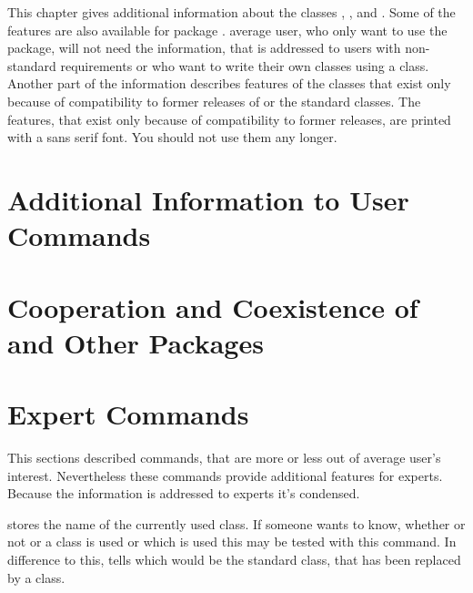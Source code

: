 This chapter gives additional information about the \KOMAScript{} classes
, , and . Some of the features
are also available for package .  average user, who only
want to use the package, will not need the information, that is addressed to
users with non-standard requirements or who want to write their own classes
using a \KOMAScript{} class. Another part of the information describes features
of the classes that exist only because of compatibility to former
releases of \KOMAScript{} or the standard classes. The features, that exist
only because of compatibility to former \KOMAScript{} releases, are printed
with a sans serif font. You should not use them any longer.


\section{Additional Information to User Commands}



\section{Cooperation and Coexistence of \KOMAScript{} and Other Packages}



\section{Expert Commands}

This sections described commands, that are more or less out of average user's
interest. Nevertheless these commands provide additional features for
experts. Because the information is addressed to experts it's condensed.


\begin{Declaration}
\end{Declaration}
 stores the name of the currently used \KOMAScript{}
class. If someone wants to know, whether or not or a \KOMAScript{} class is
used or which \KOMAScript{} is used this may be tested with this command. In
difference to this,  tells which would be the standard class,
that has been replaced by a \KOMAScript{} class.

